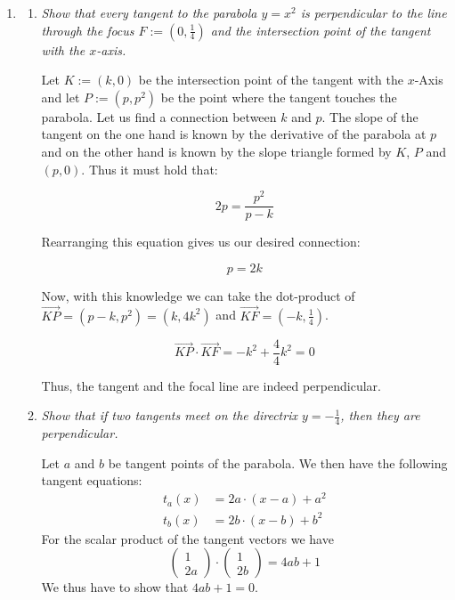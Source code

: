 \documentclass[a4paper,11pt,notitlepage,fullpage]{paper}
\theoremstyle{plain}
\theoremstyle{definition}
\begin{document}
\begin{enumerate}

\item
\begin{enumerate}
\item \emph{Show that every tangent to the parabola $y=x^2$ is perpendicular to the line through the focus $F := (0, \frac{1}{4})$ and the intersection point of the tangent with the $x$-axis.}

Let $K := (k, 0)$ be the intersection point of the tangent with the $x$-Axis and let $P := (p, p^2)$ be the point where the  tangent touches the parabola. Let us find a connection between $k$ and $p$. The slope of the tangent on the one hand is known by the derivative of the parabola at $p$ and on the other hand is known by the slope triangle formed by $K$, $P$ and $(p,0)$. Thus it must hold that:

\begin{equation*}
2p = \frac{p^2}{p-k}
\end{equation*}

Rearranging this equation gives us our desired connection:

\begin{equation*}
p = 2k
\end{equation*}

Now, with this knowledge we can take the dot-product of $\overrightarrow{KP} = (p-k, p^2) = (k, 4k^2)$ and $\overrightarrow{KF} = (-k, \frac{1}{4})$.

\begin{equation*}
\overrightarrow{KP} \cdot \overrightarrow{KF} = -k^2 + \frac{4}{4}k^2 = 0
\end{equation*}

Thus, the tangent and the focal line are indeed perpendicular.

\item \emph{Show that if two tangents meet on the directrix $y = -\frac{1}{4}$, then they are perpendicular.}

Let $a$ and $b$ be tangent points of the parabola. We then have the following tangent equations:
\begin{align*}
	t_a(x)&=2a\cdot (x-a)+a^2\\
	t_b(x)&=2b\cdot (x-b)+b^2
\end{align*}
For the scalar product of the tangent vectors we have
\begin{equation*}
\begin{pmatrix}
1 \\ 2a\end{pmatrix} \cdot \begin{pmatrix} 1 \\ 2b\end{pmatrix}=4ab+1
\end{equation*}
We thus have to show that $4ab+1=0$.


\end{enumerate}
\end{enumerate}
\end{document}
